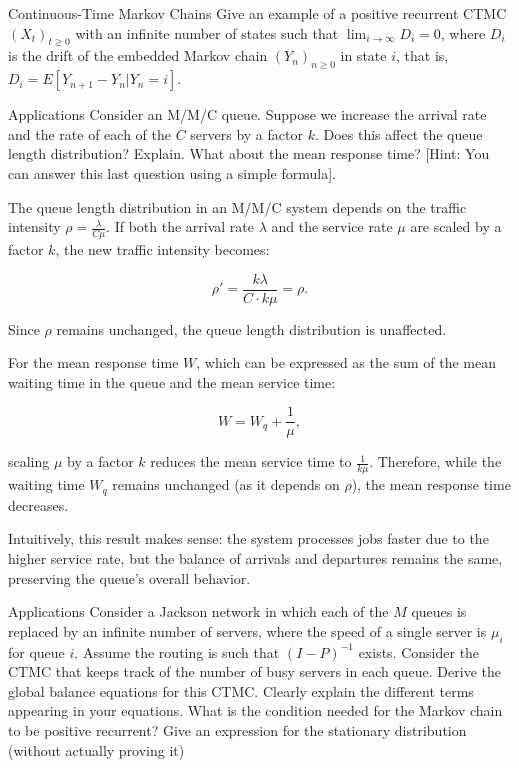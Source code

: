 \begin{problem}{Continuous-Time Markov Chains}
Give an example of a positive recurrent CTMC $(X_t)_{t\geq 0}$ with an infinite number of states such that $\lim_{i\rightarrow\infty} D_i = 0$, where $D_i$ is the drift of the embedded Markov chain $(Y_n)_{n\geq 0}$ in state $i$, that is, $D_i = E[Y_{n+1} - Y_n|Y_n = i]$.
\end{problem}

\begin{problem}{Applications}
Consider an M/M/C queue. Suppose we increase the arrival rate and the rate of each of the $C$ servers by a factor $k$. Does this affect the queue length distribution? Explain. What about the mean response time? [Hint: You can answer this last question using a simple formula].
\end{problem}
\begin{solution}
The queue length distribution in an M/M/C system depends on the traffic intensity $\rho = \frac{\lambda}{C\mu}$. If both the arrival rate $\lambda$ and the service rate $\mu$ are scaled by a factor $k$, the new traffic intensity becomes:

\[
\rho' = \frac{k\lambda}{C \cdot k\mu} = \rho.
\]

Since $\rho$ remains unchanged, the queue length distribution is unaffected.

For the mean response time $W$, which can be expressed as the sum of the mean waiting time in the queue and the mean service time:

\[
W = W_q + \frac{1}{\mu},
\]

scaling $\mu$ by a factor $k$ reduces the mean service time to $\frac{1}{k\mu}$. Therefore, while the waiting time $W_q$ remains unchanged (as it depends on $\rho$), the mean response time decreases.

Intuitively, this result makes sense: the system processes jobs faster due to the higher service rate, but the balance of arrivals and departures remains the same, preserving the queue's overall behavior.
\end{solution}

\begin{problem}{Applications}
  Consider a Jackson network in which each of the $M$ queues is replaced by an infinite number of servers, where the speed of a single server is $\mu_i$ for queue $i$. Assume the routing is such that $(I - P )^{-1}$ exists. Consider the CTMC that keeps track of the number of busy servers in each queue. Derive the global balance equations for this CTMC. Clearly explain the different terms appearing in your equations. What is the condition needed for the Markov chain to be positive recurrent? Give an expression for the stationary distribution (without actually proving it)
\end{problem}
